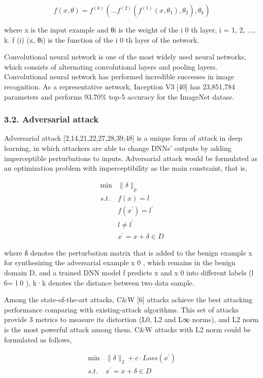 \documentclass{article}
\begin{document}
$$f(x,\theta)=f^{(k)}(\ldots f^{(2)}(f^{(1)}(x,\theta_{1}),\theta_{2}),\theta_{k})\tag{1}$$

where x is the input example and θi is the weight of the i 0 th layer, i = 1, 2, ..., k. f (i) (x, θi) is the function of the i 0 th layer of the network.

Convolutional neural network is one of the most widely used neural networks, which consists of alternating convolutional layers and pooling layers. Convolutional neural network has performed incredible successes in image recognition. As a representative network, Inception V3 [40] has 23,851,784 parameters and performs 93.70\% top-5 accuracy for the ImageNet datase.

\subsubsection{3.2. Adversarial attack}

Adversarial attack [2,14,21,22,27,28,39,48] is a unique form of attack in deep learning, in which attackers are able to change DNNs' outputs by adding imperceptible perturbations to inputs. Adversarial attack would be formulated as an optimization problem with imperceptibility as the main constraint, that is,

$$\begin{array}{ll}\min&\|\delta\|_{p}\\ s.t.&f(x)=l\\ &f(x^{\prime})=l^{\prime}\\ &l\neq l^{\prime}\\ &x^{\prime}=x+\delta\in D\end{array}\tag{2}$$

where δ denotes the perturbation matrix that is added to the benign example x for synthesizing the adversarial example x 0 , which remains in the benign domain D, and a trained DNN model f predicts x and x 0 into different labels (l 6= l 0 ), k·k denotes the distance between two data sample.

Among the state-of-the-art attacks, C\&W [6] attacks achieve the best attacking performance comparing with existing-attack algorithms. This set of attacks provide 3 metrics to measure its distortion (L0, L2 and L∞ norms), and L2 norm is the most powerful attack among them. C\&W attacks with L2 norm could be formulated as follows,

$$\begin{array}{ll}\min&\|\delta\|_{2}+c\cdot Loss(x^{\prime})\\ s.t.&x^{\prime}=x+\delta\in D\end{array}\tag{3}$$
\end{document}
